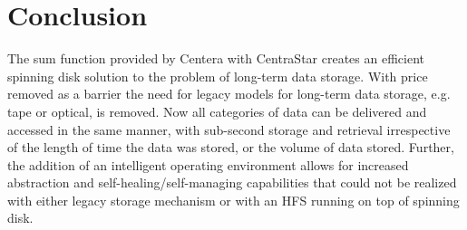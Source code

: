 \section{Conclusion}

The sum function provided by Centera with CentraStar creates an
efficient spinning disk solution to the problem of long-term data
storage. With price removed as a barrier the need for legacy models for
long-term data storage, e.g. tape or optical, is removed. Now all
categories of data can be delivered and accessed in the same manner,
with sub-second storage and retrieval irrespective of the length of time
the data was stored, or the volume of data stored. Further, the addition
of an intelligent operating environment allows for increased abstraction
and self-healing/self-managing capabilities that could not be realized
with either legacy storage mechanism or with an HFS running on top of
spinning disk.
